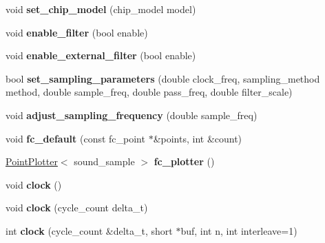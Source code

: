 \begin{DoxyCompactItemize}
\item 
\hypertarget{classSID2_af9be91b50562ba3ff09f4bfbc2df24f6}{void {\bfseries set\-\_\-chip\-\_\-model} (chip\-\_\-model model)}\label{classSID2_af9be91b50562ba3ff09f4bfbc2df24f6}

\item 
\hypertarget{classSID2_afd966ae731791f08df2e5d3dccdc13cf}{void {\bfseries enable\-\_\-filter} (bool enable)}\label{classSID2_afd966ae731791f08df2e5d3dccdc13cf}

\item 
\hypertarget{classSID2_ad212c6dc62ff6afe29b7c067d95e6688}{void {\bfseries enable\-\_\-external\-\_\-filter} (bool enable)}\label{classSID2_ad212c6dc62ff6afe29b7c067d95e6688}

\item 
\hypertarget{classSID2_a2584664d78bf0fe9711d3a22c5dcb857}{bool {\bfseries set\-\_\-sampling\-\_\-parameters} (double clock\-\_\-freq, sampling\-\_\-method method, double sample\-\_\-freq, double pass\-\_\-freq, double filter\-\_\-scale)}\label{classSID2_a2584664d78bf0fe9711d3a22c5dcb857}

\item 
\hypertarget{classSID2_a630fb3015d92e07e449952650a26f3f8}{void {\bfseries adjust\-\_\-sampling\-\_\-frequency} (double sample\-\_\-freq)}\label{classSID2_a630fb3015d92e07e449952650a26f3f8}

\item 
\hypertarget{classSID2_a8fb2b81b924a752cb24f3f2a400f3f88}{void {\bfseries fc\-\_\-default} (const fc\-\_\-point $\ast$\&points, int \&count)}\label{classSID2_a8fb2b81b924a752cb24f3f2a400f3f88}

\item 
\hypertarget{classSID2_a555a6efd2e92f701b8f0dbc9be1461ad}{\hyperlink{classPointPlotter}{Point\-Plotter}$<$ sound\-\_\-sample $>$ {\bfseries fc\-\_\-plotter} ()}\label{classSID2_a555a6efd2e92f701b8f0dbc9be1461ad}

\item 
\hypertarget{classSID2_a9e7ccac331b59e2947dc2500db72cdc4}{void {\bfseries clock} ()}\label{classSID2_a9e7ccac331b59e2947dc2500db72cdc4}

\item 
\hypertarget{classSID2_ad1d4fcca570d79b87e8c6d7ace9c6c49}{void {\bfseries clock} (cycle\-\_\-count delta\-\_\-t)}\label{classSID2_ad1d4fcca570d79b87e8c6d7ace9c6c49}

\item 
\hypertarget{classSID2_aa4b34c2667b41b18e3aa40dac4e832a7}{int {\bfseries clock} (cycle\-\_\-count \&delta\-\_\-t, short $\ast$buf, int n, int interleave=1)}\label{classSID2_aa4b34c2667b41b18e3aa40dac4e832a7}


\end{DoxyCompactItemize}
